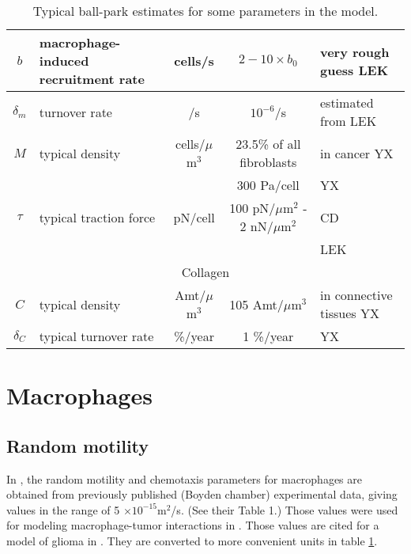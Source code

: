 \documentclass{article}
\begin{document}
\begin{table}[H]
\begin{tabularx}{\textwidth}{|c|p{3.5cm}|c|c|X|}
        $b$ & macrophage-induced \newline recruitment rate & cells/s & $2-10\times b_0$ & very rough guess LEK\\ \hline
        
        $\delta_m$ & turnover rate & /s & $10^{-6}$/s & estimated from \cite{masur1996myofibroblasts} LEK\\ \hline

        $M$ & typical density & cells/$\mu$m$^3$ & 23.5\% of all fibroblasts & in cancer \cite{risom2022transition} YX\\ \hline

        \multirow{3}{*}{$\tau$} & \multirow{3}{*}{typical traction force} & \multirow{3}{*}{pN/cell} & 300 Pa/cell & \cite{chen2007alpha} YX\\ \cline{4-5}

        & & & 100 pN/$\mu$m$^2$ - 2 nN/$\mu$m$^2$ & \cite{yang2021quantitative} CD\\ \cline{4-5}

        & & & & \cite{zollinger2018dependence} LEK \\ \hline

        \multicolumn{5}{|c|}{Collagen} \\ \hline

        $C$ & typical density &Amt/$\mu$m$^3$ & 105 Amt/$\mu$m$^3$ & in connective tissues \cite{rutenberg2016uniform} YX\\ \hline

        $\delta_C$ & typical turnover rate & \%/year & 1 \%/year & \cite{hackenberg2020collagen,verzijl2000effect} YX\\ \hline
        
        \end{tabularx}
        \caption{Typical ball-park estimates for some parameters in the model.}
        \label{tab:paramsSearch}
    \end{table}

\section*{Macrophages}
    \subsection{Random motility}
         In \cite{owen1997pattern}, the random motility and chemotaxis parameters for macrophages are obtained from previously published (Boyden chamber)  experimental data, giving values in the range of 5 $\times 10^{-15}$m$^2$/s. (See their Table 1.) Those values were used for modeling macrophage-tumor interactions in \cite{owen1997pattern}. Those values are cited for a model of glioma in \cite{khajanchi2021spatiotemporal}. They are converted to more convenient units in table \ref{tab:paramsSearch}.
\end{document}
